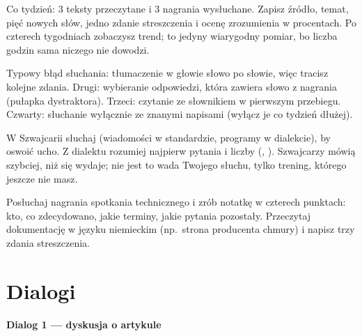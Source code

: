\begin{zasada}[Dziennik]
Co tydzień: 3 teksty przeczytane i 3 nagrania wysłuchane. Zapisz źródło, temat, pięć nowych słów, jedno zdanie streszczenia i ocenę
zrozumienia w procentach. Po czterech tygodniach zobaczysz trend; to jedyny wiarygodny pomiar, bo liczba godzin sama niczego nie dowodzi.
\end{zasada}

\begin{falle}
Typowy błąd słuchania: tłumaczenie w głowie słowo po słowie, więc tracisz kolejne zdania. Drugi: wybieranie odpowiedzi, która zawiera słowo
z nagrania (pułapka dystraktora). Trzeci: czytanie ze słownikiem w pierwszym przebiegu. Czwarty: słuchanie wyłącznie ze znanymi napisami
(wyłącz je co tydzień dłużej).
\end{falle}

\begin{szwajcaria}
W Szwajcarii słuchaj  (wiadomości w standardzie, programy w dialekcie), by oswoić ucho. Z dialektu rozumiej najpierw
pytania i liczby (, ). Szwajcarzy mówią szybciej, niż się wydaje; nie jest to wada Twojego słuchu, tylko trening, którego jeszcze nie masz.
\end{szwajcaria}

\begin{praca}
Posłuchaj nagrania spotkania technicznego i zrób notatkę w czterech punktach: kto, co zdecydowano, jakie terminy, jakie pytania pozostały.
Przeczytaj dokumentację w języku niemieckim (np.\ strona producenta chmury) i napisz trzy zdania streszczenia.
\end{praca}

\section{Dialogi}
\textbf{Dialog 1 --- dyskusja o artykule}
\begin{dialog}
\end{dialog}


